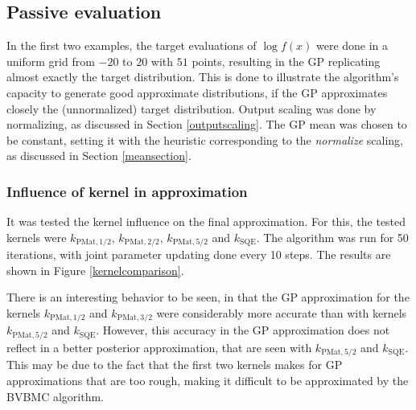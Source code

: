 \subsection{Passive evaluation}
In the first two examples, the target evaluations of $\log f(x)$ were done in a uniform grid from $-20$ to $20$ with $51$ points, resulting in the GP replicating almost exactly the target distribution. This is done to illustrate the algorithm's capacity to generate good approximate distributions, if the GP approximates closely the (unnormalized) target distribution. Output scaling was done by normalizing, as discussed in Section \ref{outputscaling}. The GP mean was chosen to be constant, setting it with the heuristic corresponding to the \textit{normalize} scaling, as discussed in Section \ref{meansection}.

\subsubsection{Influence of kernel in approximation}
It was tested the kernel influence on the final approximation. For this, the tested kernels were $k_{\text{PMat},1/2}$, $k_{\text{PMat},2/2}$, $k_{\text{PMat},5/2}$ and $k_{\text{SQE}}$. The algorithm was run for 50 iterations, with joint parameter updating done every 10 steps. The results are shown in Figure \ref{kernelcomparison}.

There is an interesting behavior to be seen, in that the GP approximation for the kernels $k_{\text{PMat},1/2}$ and  $k_{\text{PMat},3/2}$ were considerably more accurate than with kernels $k_{\text{PMat},5/2}$ and $k_{\text{SQE}}$. However, this accuracy in the GP approximation does not reflect in a better posterior approximation, that are seen with $k_{\text{PMat},5/2}$ and $k_{\text{SQE}}$. This may be due to the fact that the first two kernels makes for GP approximations that are too rough, making it difficult to be approximated by the BVBMC algorithm.

